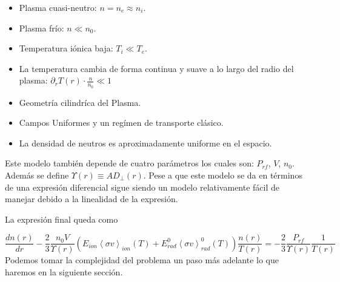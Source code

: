   \begin{itemize}
    \item Plasma cuasi-neutro: $n = n_e \approx n_i$.
    \item Plasma fr\'io: $n \ll n_0$.
    \item Temperatura i\'onica baja: $T_i \ll T_e$.
    \item La temperatura cambia de forma continua y suave a lo largo del radio del plasma: $\partial_rT(r) \cdot \frac{n}{n_0} \ll 1$
    \item Geometr\'ia cilindr\'ica del Plasma.
    \item Campos Uniformes y un regímen de transporte cl\'asico.
    \item La densidad de neutros es aproximadamente uniforme en el espacio.
  \end{itemize}

  Este modelo tambi\'en depende de cuatro par\'ametros los cuales son: $P_{rf}$, $V$, $n_0$. Además se define $\varUpsilon(r) \equiv A D_\perp(r)$. Pese a que este modelo se da en t\'erminos de una expresi\'on diferencial sigue siendo un modelo relativamente f\'acil de manejar debido a la linealidad de la expresi\'on. 

  La expresi\'on final queda como 

  \begin{equation}
    \frac{dn(r)}{dr} - \frac{2}{3}\frac{n_0 V}{\varUpsilon(r)}\left(  E_{ion}\left<\sigma v\right>_{ion}(T) + E_{rad}^0\left<\sigma v\right>_{rad}^0(T)\right)\frac{n(r)}{T(r)} = - \frac{2}{3}\frac{P_{rf}}{\varUpsilon(r)}\frac{1}{T(r)}
  \end{equation}
  Podemos tomar la complejidad del problema un paso m\'as adelante lo que haremos en la siguiente secci\'on.
